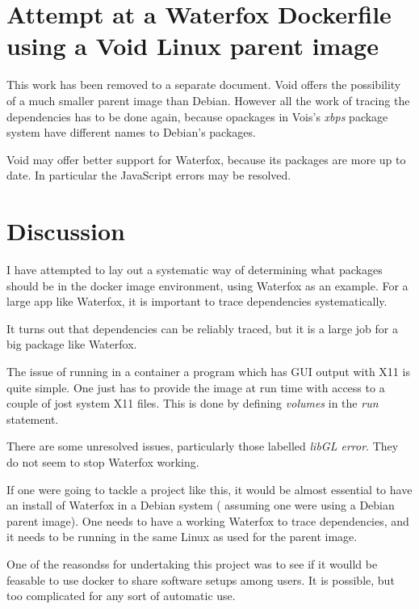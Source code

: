 \documentclass{article}  %
\begin{document}
\section{Attempt at a Waterfox Dockerfile using a Void Linux parent image}
This work has been removed to a separate document. Void offers the possibility of a much smaller parent image than Debian. However all the work of tracing the dependencies has to be done again, because opackages in Vois's {\em xbps} package system have different names to Debian's packages.

Void may offer better support for Waterfox, because its packages are more up to date. In particular the JavaScript errors may be resolved. 

\section{Discussion}
I have attempted to lay out a systematic way of determining what packages should be in the docker image environment, using Waterfox as an example. For a large app like Waterfox, it is important to trace dependencies systematically. 

It turns out that dependencies can be reliably traced, but it is a large job for a big package like Waterfox.

The issue of running in a container a program which has GUI output with X11 is quite simple. One just has to provide the image at run time with access to a couple of jost system X11 files.  This is done by defining {\em volumes} in the {\em run} statement.

There are some unresolved issues, particularly those labelled {\em libGL error}. They do not seem to stop Waterfox working.

If one were going to tackle a project like this, it would be almost essential to have an install of Waterfox in a  Debian system ( assuming one were using a Debian parent image). One needs to have a working Waterfox to trace dependencies,  and it needs to be running in the same Linux as used for the parent image. 

One of the reasondss for undertaking this project was to see if it woulld be feasable to use docker to share software setups among users.  It is possible, but too complicated for any sort of automatic use. 
\end{document}
